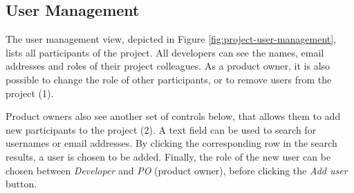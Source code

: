 \documentclass[
	accentcolor=tud1a %
]{tudreport}
\begin{document}
\subsection{User Management}
\label{sec:user-mgmt}

The user management view, depicted in Figure \ref{fig:project-user-management}, lists all participants of the project. All developers can see the names, email addresses and roles of their project colleagues. As a product owner, it is also possible to change the role of other participants, or to remove users from the project (1).

Product owners also see another set of controls below, that allows them to add new participants to the project (2). A text field can be used to search for usernames or email addresses. By clicking the corresponding row in the search results, a user is chosen to be added. Finally, the role of the new user can be chosen between \emph{Developer} and \emph{PO} (product owner), before clicking the \emph{Add user} button.
\end{document}
